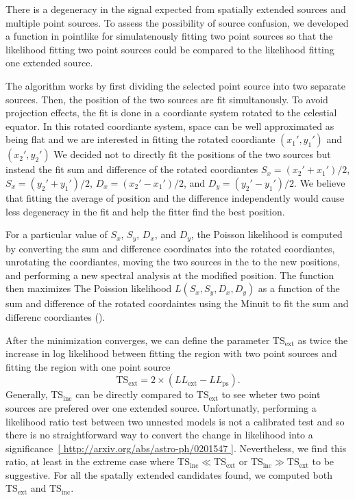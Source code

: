 \documentclass[12pt,preprint]{aastex}
\newcommand{\tsext}{{\ensuremath{\text{TS}_\text{ext}}}\xspace}
\newcommand{\tsinc}{\ensuremath{\text{TS}_\text{inc}}\xspace}
\newcommand{\pointlike}{\text{\em pointlike}\xspace}
\begin{document}
There is a degeneracy in the signal expected from spatially extended
sources and multiple point sources.  To assess the possibility of source
confusion, we developed a function in pointlike for simulatenously fitting
two point sources so that the likelihood fitting two point sources
could be compared to the likelihood fitting one extended source.

The algorithm works by first dividing the selected point source into
two separate sources. Then, the position of the two sources 
are fit simultanously. To avoid projection effects, the fit is
done in a coordiante system rotated to the celestial equator.
In this rotated coordiante system, space can be well approximated
as being flat and we are interested in fitting the 
rotated coordiante $(x_1',y_1')$ and $(x_2',y_2')$
We decided not to directly fit the positions of the two sources 
but instead the fit sum and difference of the rotated coordiantes
$S_x=(x_2'+x_1')/2$, $S_x=(y_2'+y_1')/2$, $D_x=(x_2'-x_1')/2$, and $D_y=(y_2'-y_1')/2$.
We believe that fitting the average of position and the difference
independently would cause less degeneracy in the fit and help the fitter
find the best position.

For a particular value of $S_x$, $S_y$, $D_x$, and $D_y$, the Poisson
likelihood is computed by converting the sum and difference coordinates
into the rotated coordiantes, unrotating the coordiantes, moving the
two sources in the \pointlike to the new positions, and performing a new
spectral analysis at the modified position.  The function then maximizes
The Poission likelihood $L(S_x,S_y,D_x,D_y)$ as a function of the sum
and difference of the rotated coordaintes using the Minuit to fit the
sum and differenc coordiantes (\cite{minuit_documentation}).

After the minimization converges, we can define the parameter $\tsext$
as twice the increase in log likelihood between fitting the region with
two point sources and fitting the region with one point source
\begin{equation}
  \tsext=2\times(LL_\text{ext}-LL_\text{ps}).
\end{equation}
Generally, \tsinc can be directly compared to \tsext to see wheter two
point sources are prefered over one extended source. Unfortunatly,
performing a likelihood ratio test between two unnested models
is not a calibrated test and so there is no straightforward way
to convert the change in likelihood into a significance~\ref{
http://arxiv.org/abs/astro-ph/0201547 }. Nevertheless, we find this
ratio, at least in the extreme case where $\tsinc \ll \tsext$ or
$\tsinc\gg\tsext$ to be suggestive. For all the spatally extended
candidates found, we computed both \tsext and \tsinc.
\end{document}
